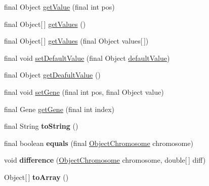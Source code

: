 \begin{CompactItemize}
\item 
final Object \hyperlink{classjenes_1_1chromosome_1_1_object_chromosome_f221c16bbcd9f03867d2e4295216cc93}{getValue} (final int pos)
\item 
final Object\mbox{[}$\,$\mbox{]} \hyperlink{classjenes_1_1chromosome_1_1_object_chromosome_f41d722cff36fbb837c0038c885de04c}{getValues} ()
\item 
final Object\mbox{[}$\,$\mbox{]} \hyperlink{classjenes_1_1chromosome_1_1_object_chromosome_7476459dce852e9a7fce5d35276817e8}{getValues} (final Object values\mbox{[}$\,$\mbox{]})
\item 
final void \hyperlink{classjenes_1_1chromosome_1_1_object_chromosome_44d425a777314b8e9de58b680e686454}{setDefaultValue} (final Object \hyperlink{classjenes_1_1chromosome_1_1_object_chromosome_f5e2ac0b5272d948ec566f824baa3411}{defaultValue})
\item 
final Object \hyperlink{classjenes_1_1chromosome_1_1_object_chromosome_ea3da542f5b0d9c3300dc76cec3385f9}{getDeafultValue} ()
\item 
final void \hyperlink{classjenes_1_1chromosome_1_1_object_chromosome_e68b9a0568dfc16f4f543438e54ac0ea}{setGene} (final int pos, final Object value)
\item 
final Gene \hyperlink{classjenes_1_1chromosome_1_1_object_chromosome_badaf50e19a5fd0ac5279de47914af99}{getGene} (final int index)
\item 
\hypertarget{classjenes_1_1chromosome_1_1_object_chromosome_660652ffc502cace60aceb16a5854de3}{
final String \textbf{toString} ()}
\label{classjenes_1_1chromosome_1_1_object_chromosome_660652ffc502cace60aceb16a5854de3}

\item 
\hypertarget{classjenes_1_1chromosome_1_1_object_chromosome_beb710a44460d3699bf991590c41574a}{
final boolean \textbf{equals} (final \hyperlink{classjenes_1_1chromosome_1_1_object_chromosome}{ObjectChromosome} chromosome)}
\label{classjenes_1_1chromosome_1_1_object_chromosome_beb710a44460d3699bf991590c41574a}

\item 
\hypertarget{classjenes_1_1chromosome_1_1_object_chromosome_8afa1cbf1df7b9d65a9a8c34f476aa67}{
void \textbf{difference} (\hyperlink{classjenes_1_1chromosome_1_1_object_chromosome}{ObjectChromosome} chromosome, double\mbox{[}$\,$\mbox{]} diff)}
\label{classjenes_1_1chromosome_1_1_object_chromosome_8afa1cbf1df7b9d65a9a8c34f476aa67}

\item 
\hypertarget{classjenes_1_1chromosome_1_1_object_chromosome_dd9ff43a69d5991043baa4423877f255}{
Object\mbox{[}$\,$\mbox{]} \textbf{toArray} ()}
\label{classjenes_1_1chromosome_1_1_object_chromosome_dd9ff43a69d5991043baa4423877f255}

\end{CompactItemize}
